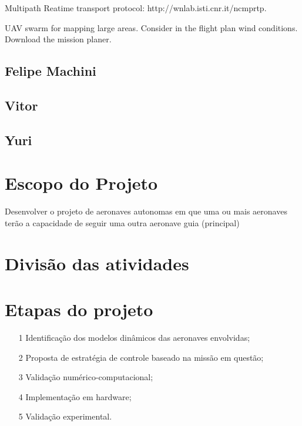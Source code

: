 \documentclass{article}
\begin{document}
    Multipath Reatime transport protocol: http://wnlab.isti.cnr.it/ncmprtp.
    
    UAV swarm for mapping large areas. Consider in the flight plan wind conditions. Download the mission planer.
    
    \subsection{Felipe Machini}
    
    \subsection{Vitor}
    
    \subsection{Yuri}

\section{Escopo do Projeto}

Desenvolver o projeto de aeronaves autonomas em que uma ou mais aeronaves terão a capacidade de seguir uma outra aeronave guia (principal)

\section{Divisão das atividades}

\section{Etapas do projeto}

\begin{itemize}
    \item[1] Identificação dos modelos dinâmicos das aeronaves envolvidas;
    \item[2] Proposta de estratégia de controle baseado na missão em questão;
    \item[3] Validação numérico-computacional;
    \item[4] Implementação em hardware;
    \item[5] Validação experimental.
\end{itemize}
\end{document}
